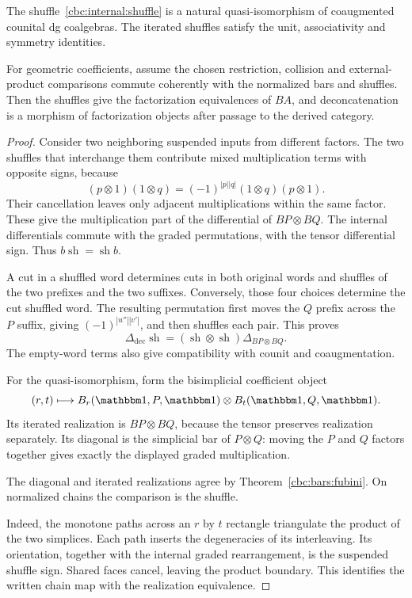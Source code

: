 \begin{proposition}\label{cbc:internal:shuffle-factorization}
The shuffle~\eqref{cbc:internal:shuffle} is a natural quasi-isomorphism of coaugmented counital dg coalgebras. The iterated shuffles satisfy the unit, associativity and symmetry identities.

For geometric coefficients, assume the chosen restriction, collision and external-product comparisons commute coherently with the normalized bars and shuffles. Then the shuffles give the factorization equivalences of $BA$, and deconcatenation is a morphism of factorization objects after passage to the derived category.
\end{proposition}
\begin{proof}
Consider two neighboring suspended inputs from different factors. The two shuffles that interchange them contribute mixed multiplication terms with opposite signs, because
\[
 (p\otimes1)(1\otimes q)
   =(-1)^{|p||q|}(1\otimes q)(p\otimes1).
\]
Their cancellation leaves only adjacent multiplications within the same factor. These give the multiplication part of the differential of $BP\otimes BQ$. The internal differentials commute with the graded permutations, with the tensor differential sign. Thus $b\operatorname{sh}=\operatorname{sh}b$.

A cut in a shuffled word determines cuts in both original words and shuffles of the two prefixes and the two suffixes. Conversely, those four choices determine the cut shuffled word. The resulting permutation first moves the $Q$ prefix across the $P$ suffix, giving $(-1)^{|u''||v'|}$, and then shuffles each pair. This proves
\[
 \Delta_{\mathrm{dec}}\operatorname{sh}
   =(\operatorname{sh}\otimes\operatorname{sh})\Delta_{BP\otimes BQ}.
\]
The empty-word terms also give compatibility with counit and coaugmentation.

For the quasi-isomorphism, form the bisimplicial coefficient object
\[
 (r,t)\longmapsto B_r(\mathbbm1,P,\mathbbm1)
                  \otimes B_t(\mathbbm1,Q,\mathbbm1).
\]
Its iterated realization is $BP\otimes BQ$, because the tensor preserves realization separately. Its diagonal is the simplicial bar of $P\otimes Q$: moving the $P$ and $Q$ factors together gives exactly the displayed graded multiplication.

The diagonal and iterated realizations agree by Theorem~\ref{cbc:bars:fubini}. On normalized chains the comparison is the shuffle.

Indeed, the monotone paths across an $r$ by $t$ rectangle triangulate the product of the two simplices. Each path inserts the degeneracies of its interleaving. Its orientation, together with the internal graded rearrangement, is the suspended shuffle sign. Shared faces cancel, leaving the product boundary. This identifies the written chain map with the realization equivalence.


\end{proof}
